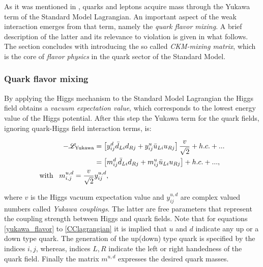 As it was mentioned in , quarks and leptons acquire mass through the Yukawa term
of the Standard Model Lagrangian. An important aspect of the weak interaction emerges from that term,
namely the {\it quark flavor mixing}. A brief description of the latter and its relevance to \CP violation
is given in what follows. The section concludes with introducing the so called {\it CKM-mixing matrix},
which is the core of {\it flavor physics} in the quark sector of the Standard Model.

\subsubsection{Quark flavor mixing}
By applying the Higgs mechanism \cite{PhysRevLett.13.321,PhysRevLett.13.508} to the Standard Model Lagrangian
the Higgs field obtains a {\it vacuum expectation value}, which corresponds to the lowest energy value of the Higgs
potential. After this step the Yukawa term for the quark fields, ignoring quark-Higgs field interaction terms, is:

\begin{subequations}
\label{yukawa_flavor}
\centering
  \begin{align}
  -\mathscr{L}_{\text{Yukawa}} &= \left[ y_{ij}^d \bar{d}_{Li} d_{Rj} + y_{ij}^u \bar{u}_{Li} u_{Rj} \right] \frac{v}{\sqrt{2}} + h.c. + ...  \\
                               &= \left[ m_{ij}^d \bar{d}_{Li} d_{Rj} + m_{ij}^u \bar{u}_{Li} u_{Rj} \right] + h.c. + ...,  \\
                               \text{with} \;\;\; m^{u,d}_{i,j} = \frac{v}{\sqrt{2}} & y_{ij}^{u,d}, \nonumber
  \end{align}
\end{subequations}

\noindent where $v$ is the Higgs vacuum expectation value and $y_{ij}^{u,d}$ are complex valued numbers called {\it Yukawa couplings}.
The latter are free parameters that represent the coupling strength between Higgs and quark fields.
Note that for equations \ref{yukawa_flavor} to \ref{CClagrangian} it is implied that $u$ and $d$ indicate
any up or a down type quark. The generation of the up(down) type quark is specified by the indices $i,j$,
whereas, indices $L,R$ indicate the left or right handedness of the quark field.
Finally the matrix $m^{u,d}$ expresses the desired quark masses.

